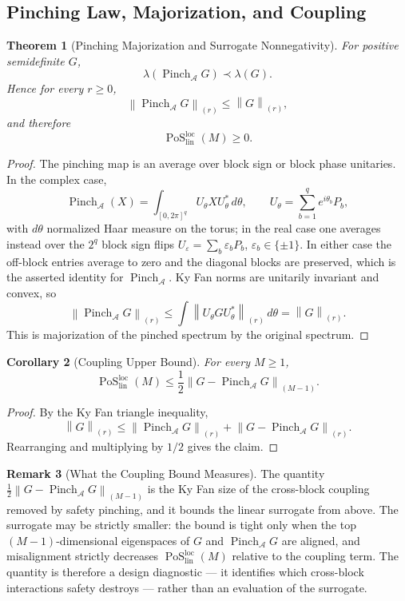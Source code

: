 \documentclass[12pt]{article}
\newtheorem{theorem}{Theorem}[section]
\newtheorem{corollary}[theorem]{Corollary}
\theoremstyle{definition}
\newtheorem{remark}[theorem]{Remark}
\DeclareMathOperator{\PoS}{PoS}
\newcommand{\EA}{\operatorname{Pinch}_{\mathcal A}}
\newcommand{\KyF}[2]{\left\|#1\right\|_{(#2)}}
\newcommand{\PoSlin}{\PoS_{\mathrm{lin}}^{\mathrm{loc}}}
\begin{document}
\subsection{Pinching Law, Majorization, and Coupling}
\label{subsec:pos-pinching}

\begin{theorem}[Pinching Majorization and Surrogate Nonnegativity]
\label{thm:pinching}
For positive semidefinite $G$,
\[
\lambda(\EA G)\prec\lambda(G).
\]
Hence for every $r\ge0$,
\[
\KyF{\EA G}{r}
\le
\KyF{G}{r},
\]
and therefore
\[
\PoSlin(M)\ge0.
\]
\end{theorem}

\begin{proof}
The pinching map is an average over block sign or block phase unitaries.  In
the complex case,
\[
\EA(X)
=
\int_{[0,2\pi]^q}
U_\theta XU_\theta^{*}\,d\theta,
\qquad
U_\theta=\sum_{b=1}^q e^{i\theta_b}P_b,
\]
with $d\theta$ normalized Haar measure on the torus; in the real case one
averages instead over the $2^q$ block sign flips
$U_\varepsilon=\sum_b\varepsilon_bP_b$, $\varepsilon_b\in\{\pm1\}$.  In either
case the off-block entries average to zero and the diagonal blocks are
preserved, which is the asserted identity for $\EA$.  Ky Fan norms are
unitarily invariant and convex, so
\[
\KyF{\EA G}{r}
\le
\int
\KyF{U_\theta G U_\theta^*}{r}
\,d\theta
=
\KyF{G}{r}.
\]
This is majorization of the pinched spectrum by the original spectrum.
\end{proof}

\begin{corollary}[Coupling Upper Bound]
\label{cor:pos-coupling}
For every $M\ge1$,
\[
\PoSlin(M)
\le
\frac12
\KyF{G-\EA G}{M-1}.
\]
\end{corollary}

\begin{proof}
By the Ky Fan triangle inequality,
\[
\KyF{G}{r}
\le
\KyF{\EA G}{r}
+
\KyF{G-\EA G}{r}.
\]
Rearranging and multiplying by $1/2$ gives the claim.
\end{proof}

\begin{remark}[What the Coupling Bound Measures]
\label{rem:pos-coupling-design}
The quantity $\tfrac12\KyF{G-\EA G}{M-1}$ is the Ky Fan size of the
cross-block coupling removed by safety pinching, and it bounds the linear
surrogate from above.  The surrogate may be strictly smaller: the bound is
tight only when the top $(M-1)$-dimensional eigenspaces of $G$ and $\EA G$ are
aligned, and misalignment strictly decreases $\PoSlin(M)$ relative to the
coupling term.  The quantity is therefore a design diagnostic --- it identifies
which cross-block interactions safety destroys --- rather than an evaluation of
the surrogate.
\end{remark}
\end{document}

